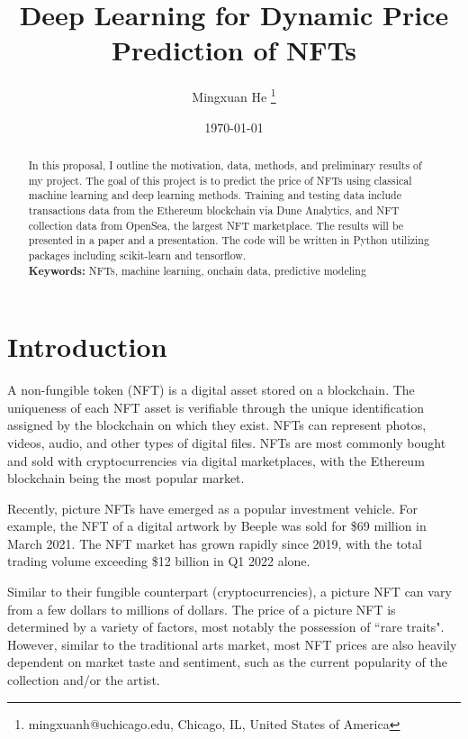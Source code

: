 \documentclass[12pt]{article}
\begin{document}
\title{Deep Learning for Dynamic Price Prediction of NFTs}


\author{Mingxuan He
    \thanks{mingxuanh@uchicago.edu, Chicago, IL, United States of America}}
\date{\today}


\maketitle 


\begin{abstract}
In this proposal, I outline the motivation, data, methods, and preliminary results of my project. The goal of this project is to predict the price of NFTs using classical machine learning and deep learning methods. Training and testing data include transactions data from the Ethereum blockchain via Dune Analytics, and NFT collection data from OpenSea, the largest NFT marketplace. The results will be presented in a paper and a presentation. The code will be written in Python utilizing packages including scikit-learn and tensorflow.\\

\textbf{Keywords:} NFTs, machine learning, onchain data, predictive modeling

\end{abstract} 



\section{Introduction}
\label{sec: introduction}
A non-fungible token (NFT) is a digital asset stored on a blockchain. The uniqueness of each NFT asset is verifiable through the unique identification assigned by the blockchain on which they exist.
NFTs can represent photos, videos, audio, and other types of digital files. NFTs are most commonly bought and sold with cryptocurrencies via digital marketplaces, with the Ethereum blockchain being the most popular market.

Recently, picture NFTs have emerged as a popular investment vehicle. For example, the NFT of a digital artwork by Beeple was sold for \$69 million in March 2021. The NFT market has grown rapidly since 2019, with the total trading volume exceeding \$12 billion in Q1 2022 alone.

Similar to their fungible counterpart (cryptocurrencies), a picture NFT can vary from a few dollars to millions of dollars. The price of a picture NFT is determined by a variety of factors, most notably the possession of ``rare traits". However, similar to the traditional arts market, most NFT prices are also heavily dependent on market taste and sentiment, such as the current popularity of the collection and/or the artist.
\end{document}
